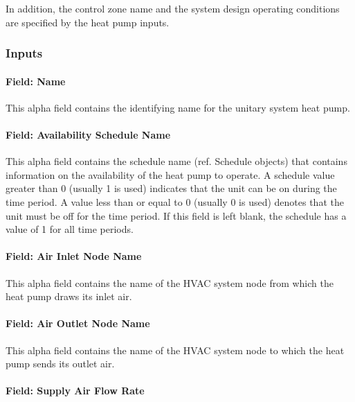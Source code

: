 In addition, the control zone name and the system design operating conditions are specified by the heat pump inputs.

\subsubsection{Inputs}\label{inputs-7-029}

\paragraph{Field: Name}\label{field-name-8-023}

This alpha field contains the identifying name for the unitary system heat pump.

\paragraph{Field: Availability Schedule Name}\label{field-availability-schedule-name-7-004}

This alpha field contains the schedule name (ref. Schedule objects) that contains information on the availability of the heat pump to operate. A schedule value greater than 0 (usually 1 is used) indicates that the unit can be on during the time period. A value less than or equal to 0 (usually 0 is used) denotes that the unit must be off for the time period. If this field is left blank, the schedule has a value of 1 for all time periods.

\paragraph{Field: Air Inlet Node Name}\label{field-air-inlet-node-name-2-002}

This alpha field contains the name of the HVAC system node from which the heat pump draws its inlet air.

\paragraph{Field: Air Outlet Node Name}\label{field-air-outlet-node-name-2-002}

This alpha field contains the name of the HVAC system node to which the heat pump sends its outlet air.

\paragraph{Field: Supply Air Flow Rate}\label{field-supply-air-flow-rate}

